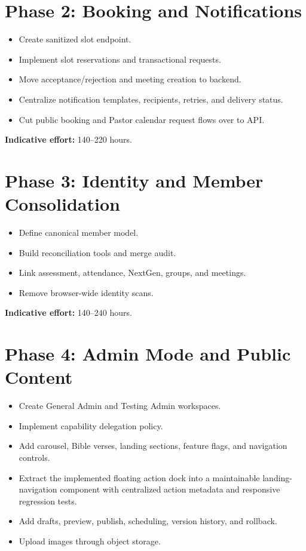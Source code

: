 \documentclass[11pt,a4paper,oneside]{report}
\begin{document}
\section{Phase 2: Booking and Notifications}

\begin{itemize}
  \item Create sanitized slot endpoint.
  \item Implement slot reservations and transactional requests.
  \item Move acceptance/rejection and meeting creation to backend.
  \item Centralize notification templates, recipients, retries, and delivery status.
  \item Cut public booking and Pastor calendar request flows over to API.
\end{itemize}

\textbf{Indicative effort:} 140--220 hours.

\section{Phase 3: Identity and Member Consolidation}

\begin{itemize}
  \item Define canonical member model.
  \item Build reconciliation tools and merge audit.
  \item Link assessment, attendance, NextGen, groups, and meetings.
  \item Remove browser-wide identity scans.
\end{itemize}

\textbf{Indicative effort:} 140--240 hours.

\section{Phase 4: Admin Mode and Public Content}

\begin{itemize}
  \item Create General Admin and Testing Admin workspaces.
  \item Implement capability delegation policy.
  \item Add carousel, Bible verses, landing sections, feature flags, and navigation controls.
  \item Extract the implemented floating action dock into a maintainable landing-navigation component with centralized action metadata and responsive regression tests.
  \item Add drafts, preview, publish, scheduling, version history, and rollback.
  \item Upload images through object storage.
\end{itemize}
\end{document}
